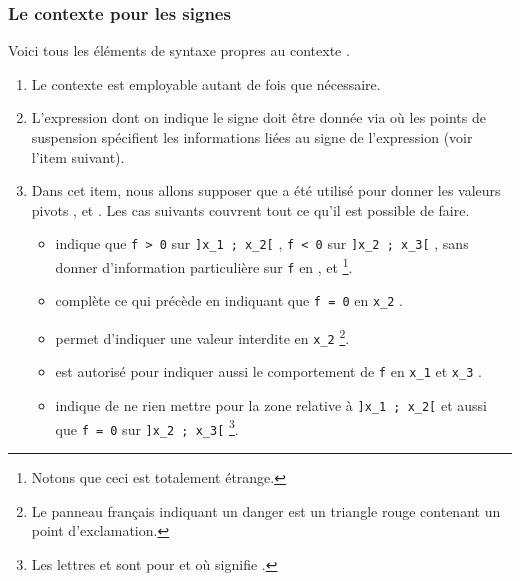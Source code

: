 \documentclass[10pt, a4paper]{article}
\begin{document}

\subsubsection{Le contexte  pour les signes}

Voici tous les éléments de syntaxe propres au contexte .
\begin{enumerate}
    \item Le contexte  est employable autant de fois que nécessaire.


	\item L'expression dont on indique le signe doit être donnée via  où les points de suspension spécifient les informations liées au signe de l'expression (voir l'item suivant). 


    \item Dans cet item, nous allons supposer que  a été utilisé pour donner les valeurs pivots  ,  et  . Les cas suivants couvrent tout ce qu'il est possible de faire.
    \begin{itemize}
        \item {} indique que
        \verb#f > 0# sur \verb#]x_1 ; x_2[# ,
        \verb#f < 0# sur \verb#]x_2 ; x_3[# ,
        sans donner d'information particulière sur
        \verb#f# en  ,  et  
        \footnote{
        	Notons que ceci est totalement étrange.
		}.


        \item {} complète ce qui précède en indiquant que \verb#f = 0# en \verb#x_2# .


        \item {} permet d'indiquer une valeur interdite en \verb#x_2#
        \footnote{
        	Le panneau français indiquant un danger est un triangle rouge contenant un point d'exclamation.
		}.


        \item {} est autorisé pour indiquer aussi le comportement de \verb#f# en \verb#x_1# et \verb#x_3# .


        \item {}  indique de ne rien mettre pour la zone relative à \verb#]x_1 ; x_2[# et aussi que \verb#f = 0# sur \verb#]x_2 ; x_3[#
        \footnote{
        	Les lettres  et  sont pour
        	 et 
        	où
        	 signifie .
		}.
    \end{itemize}
\end{enumerate}
\end{document}
